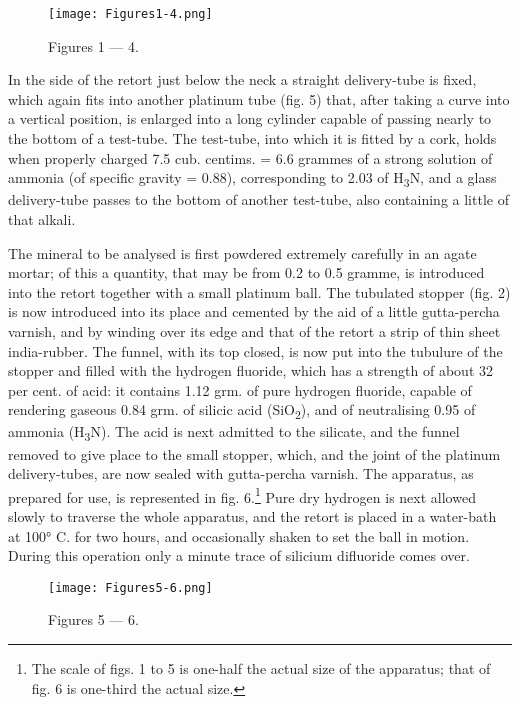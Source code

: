 \documentclass[a4paper, 12pt, oneside]{article}
\begin{document}
\begin{figure}[H]
\centering
\texttt{[image: Figures1-4.png]}
\caption{\small Figures 1 --- 4.}
\end{figure}

In the side of the retort just below the neck a straight delivery-tube is fixed, which again fits into another platinum tube (fig. 5) that, after taking a curve into a vertical position, is enlarged into a long cylinder capable of passing nearly to the bottom of a test-tube. The test-tube, into which it is fitted by a cork, holds when properly charged 7.5 cub. centims. = 6.6 grammes of a strong solution of ammonia (of specific gravity = 0.88), corresponding to 2.03 of H\textsubscript{3}N, and a glass delivery-tube passes to the bottom of another test-tube, also containing a little of that alkali.

The mineral to be analysed is first powdered extremely carefully in an agate mortar; of this a quantity, that may be from 0.2 to 0.5 gramme, is introduced into the retort together with a small platinum ball. The tubulated stopper (fig. 2) is now introduced into its place and cemented by the aid of a little gutta-percha varnish, and by winding over its edge and that of the retort a strip of thin sheet india-rubber. The funnel, with its top closed, is now put into the tubulure of the stopper and filled with the hydrogen fluoride, which has a strength of about 32 per cent. of acid: it contains 1.12 grm. of pure hydrogen fluoride, capable of rendering gaseous 0.84 grm. of silicic acid (SiO\textsubscript{2}), and of neutralising 0.95 of ammonia (H\textsubscript{3}N). The acid is next admitted to the silicate, and the funnel removed to give place to the small stopper, which, and the joint of the platinum delivery-tubes, are now sealed with gutta-percha varnish. The apparatus, as prepared for use, is represented in fig. 6.\footnote{The scale of figs. 1 to 5 is one-half the actual size of the apparatus; that of fig. 6 is one-third the actual size.} Pure dry hydrogen is next allowed slowly to traverse the whole apparatus, and the retort is placed in a water-bath at 100° C. for two hours, and occasionally shaken to set the ball in motion. During this operation only a minute trace of silicium difluoride comes over.

\begin{figure}[H]
\centering
\texttt{[image: Figures5-6.png]}
\caption{\small Figures 5 --- 6.}
\end{figure}
\end{document}
